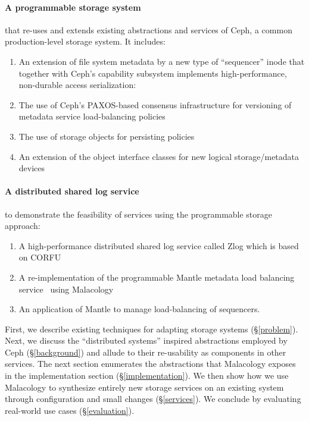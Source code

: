 \documentclass[10pt,twocolumn]{article}
\begin{document}
\paragraph*{A programmable storage system} that re-uses and extends existing abstractions and services of Ceph, a common production-level storage system. It includes:

  \begin{enumerate}
  \item
    An extension of file system metadata by a new type of ``sequencer'' inode that together with Ceph's capability subsystem implements high-performance, non-durable access serialization:
  \item
    The use of Ceph's PAXOS-based consensus infrastructure for versioning of metadata service load-balancing policies
  \item
    The use of storage objects for persisting policies
  \item
    An extension of the object interface classes for new logical storage/metadata devices
  \end{enumerate}

\paragraph*{A distributed shared log service} to demonstrate the feasibility of services using the programmable storage approach:

  \begin{enumerate}
  \item
    A high-performance distributed shared log service called Zlog which is based on CORFU~\cite{balakrishnan_corfu_2012}
  \item
    A re-implementation of the programmable Mantle metadata load balancing service~\cite{sevilla:sc15-mantle} using Malacology
  \item 
    An application of Mantle to manage load-balancing of sequencers.
  \end{enumerate}

First, we describe existing techniques for adapting storage systems
(\S\ref{problem}). Next, we discuss the ``distributed systems'' inspired
abstractions employed by Ceph (\S\ref{background}) and allude to their
re-usability as components in other services. The next section
enumerates the abstractions that Malacology exposes in the
implementation section (\S\ref{implementation}). We then show how we use
Malacology to synthesize entirely new storage services on an existing
system through configuration and small changes (\S\ref{services}). We
conclude by evaluating real-world use cases (\S\ref{evaluation}).
\end{document}
